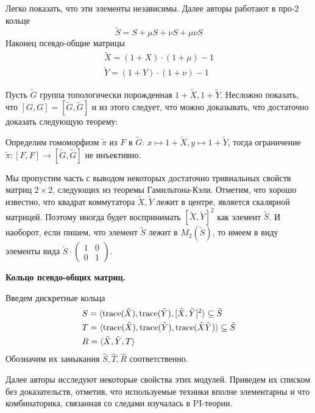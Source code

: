 Легко показать, что эти элементы независимы.
Далее авторы работают в про-$2$ кольце
\[
    \tilde{S} = S + \mu S + \nu S + \mu \nu S
\]
Наконец псевдо-общие матрицы
\begin{gather*}
    \tilde{X} = (1 + X) \cdot (1 + \mu) - 1 \\
    \tilde{Y} = (1 + Y) \cdot (1 + \nu) - 1
\end{gather*}

Пусть $\tilde{G}$ группа топологически порожденная $1 + \tilde{X}, 1 + \tilde{Y}$.
Несложно показать, что $[G, G] = [\tilde{G}, \tilde{G}]$ и из этого следует, что можно доказывать, что достаточно доказать следующую теорему:
\vskip 0.1in\noindent
\begin{theorem}
    Определим гомоморфизм $\tilde{\pi}$ из $F$ в $\tilde{G}$: $x\mapsto 1 + \tilde{X}, y\mapsto 1 + \tilde{Y}$, тогда ограничение $\tilde{\pi}: [F, F] \to [\tilde{G}, \tilde{G}]$ не инъективно.
\end{theorem}

Мы пропустим часть с выводом некоторых достаточно тривиальных свойств матриц $2\times 2$, следующих из теоремы Гамильтона-Кэли.
Отметим, что хорошо известно, что квадрат коммутатора $\tilde{X}, \tilde{Y}$ лежит в центре, является скалярной матрицей.
Поэтому иногда будет воспринимать $[\tilde{X},\tilde{Y}]^2$ как элемент $\tilde{S}$.
И наоборот, если пишем, что элемент $\tilde{S}$ лежит в $M_2(\tilde{S})$, то имеем в виду элементы вида $\tilde{S} \cdot
\begin{pmatrix}
    1 & 0 \\
    0 & 1
\end{pmatrix}$.

\vskip 0.1in\noindent
{\large\textbf{Кольцо псевдо-общих матриц.}}

Введем дискретные кольца
\begin{align*}
    & S = \langle \mathrm{trace}(\tilde{X}), \mathrm{trace}(\tilde{Y}), [\tilde{X}, \tilde{Y}]^2 \rangle \subseteq \tilde{S} \\
    & T = \langle \mathrm{trace}(\tilde{X}), \mathrm{trace}(\tilde{Y}), \mathrm{trace}(\tilde{X}\tilde{Y}) \rangle \subseteq \tilde{S} \\
    & R = \langle \tilde{X}, \tilde{Y}, T \rangle
\end{align*}
Обозначим их замыкания $\hat{S}, \hat{T}, \hat{R}$ соответственно.

Далее авторы исследуют некоторые свойства этих модулей.
Приведем их списком без доказательств, отметив, что используемые техники вполне элементарны и что комбинаторика, связанная со следами изучалась в PI-теории.

